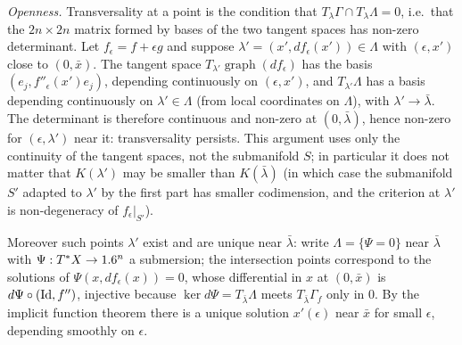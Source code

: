 \emph{Openness.} Transversality at a point is the condition that $T_\lambda\Gamma\cap
T_\lambda\Lambda=0$, i.e.\ that the $2n\times2n$ matrix formed by bases of the two tangent
spaces has non-zero determinant. Let $f_\epsilon=f+\epsilon g$ and suppose
$\lambda'=(x',df_\epsilon(x'))\in\Lambda$ with $(\epsilon,x')$ close to $(0,\bar x)$. The
tangent space $T_{\lambda'}\operatorname{graph}(df_\epsilon)$ has the basis
$(e_j,f''_\epsilon(x')e_j)$, depending continuously on $(\epsilon,x')$, and $T_{\lambda'}\Lambda$
has a basis depending continuously on $\lambda'\in\Lambda$ (from local coordinates on
$\Lambda$), with $\lambda'\to\bar\lambda$. The determinant is therefore continuous and non-zero
at $(0,\bar\lambda)$, hence non-zero for $(\epsilon,\lambda')$ near it: transversality persists.
This argument uses only the continuity of the tangent spaces, not the submanifold $S$; in
particular it does not matter that $K(\lambda')$ may be smaller than $K(\bar\lambda)$ (in which
case the submanifold $S'$ adapted to $\lambda'$ by the first part has smaller codimension, and
the criterion at $\lambda'$ is non-degeneracy of $f_\epsilon|_{S'}$).

Moreover such points $\lambda'$ exist and are unique near $\bar\lambda$: write $\Lambda=
\{\Psi=0\}$ near $\bar\lambda$ with $\Psi:T^*X\to1.6^n$ a submersion; the intersection points
correspond to the solutions of $\Psi(x,df_\epsilon(x))=0$, whose differential in $x$ at
$(0,\bar x)$ is $d\Psi\circ(\operatorname{Id},f'')$, injective because $\ker d\Psi=T_{\bar\lambda}\Lambda$
meets $T_{\bar\lambda}\Gamma_f$ only in $0$. By the implicit function theorem there is a unique
solution $x'(\epsilon)$ near $\bar x$ for small $\epsilon$, depending smoothly on $\epsilon$.

